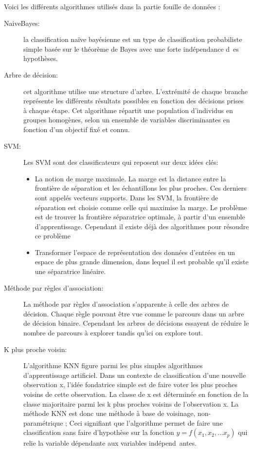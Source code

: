 \documentclass[a4paper, 11pt]{article}
\begin{document}
Voici les différents algorithmes utilisés dans la partie fouille de données : \\

\begin{description}
 \item [NaiveBayes: ] la classification naïve bayésienne est un type de classification probabiliste simple basée sur le théorème de Bayes avec une forte indépendance d\
es
 hypothèses. \\

 \item [Arbre de décision: ] cet algorithme utilise une structure d'arbre. L'extrémité de chaque branche représente les différents résultats possibles
 en fonction des décisions prises à chaque étape. Cet algorithme  répartit une population d'individus en groupes homogènes, selon un ensemble
 de variables discriminantes en fonction d'un objectif fixé et connu.\\

 \item [SVM: ] Les SVM sont des classificateurs qui reposent sur deux idées clés:

\begin{itemize}
 \item La notion de marge maximale. La marge est la distance entre la frontière de séparation et les échantillons les plus proches.
Ces derniers sont appelés vecteurs supports. Dans les SVM, la frontière de séparation est choisie comme celle qui maximise la marge.
Le problème est de trouver la frontière séparatrice optimale, à partir d'un ensemble d'apprentissage. Cependant il existe déjà des algorithmes pour résoudre ce
problème
 \item  Transformer l'espace de représentation des données d'entrées en un espace de plus grande dimension, dans lequel il est probable qu'il existe une
 séparatrice linéaire. \\
\end{itemize}
 \item [Méthode par règles d'association: ] La méthode par règles d’association s’apparente à celle des arbres de décision. Chaque règle pouvant être
 vue comme le parcours dans un arbre de décision binaire. Cependant les arbres de décisions essayent de réduire le nombre de parcours à explorer tandis
 qu’ici on explore tout.\\

 \item [K plus proche voisin: ] L’algorithme KNN figure parmi les plus simples algorithmes d’apprentissage artificiel. Dans un contexte de classification d’une
 nouvelle observation x, l’idée fondatrice simple est de faire voter les plus proches voisins de cette observation. La classe de x est déterminée en fonction de la
 classe majoritaire parmi les k plus proches voisins de l’observation x. La méthode KNN est donc une méthode à base de voisinage, non-paramétrique ; Ceci signifiant
 que l’algorithme permet de faire une classification sans faire d’hypothèse sur la fonction $y=f(x_1,x_2,…x_p)$ qui relie la variable dépendante aux variables indépend\
antes.
\end{description}
\end{document}

